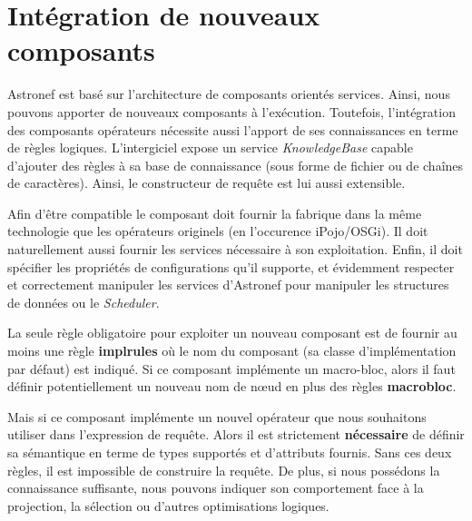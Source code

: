 \section{Intégration de nouveaux composants}\label{sec:contrib:astronef:integration}
Astronef est basé sur l'architecture de composants orientés services. Ainsi, nous pouvons apporter de nouveaux composants à l'exécution. Toutefois, l'intégration des composants opérateurs nécessite aussi l'apport de ses connaissances en terme de règles logiques. L'intergiciel expose un service \textit{KnowledgeBase} capable d'ajouter des règles à sa base de connaissance (sous forme de fichier ou de chaînes de caractères). Ainsi, le constructeur de requête est lui aussi extensible.

Afin d'être compatible le composant doit fournir la fabrique dans la même technologie que les opérateurs originels (en l'occurence iPojo/OSGi). Il doit naturellement aussi fournir les services nécessaire à son exploitation. Enfin, il doit spécifier les propriétés de configurations qu'il supporte, et évidemment respecter et correctement manipuler les services d'Astronef pour manipuler les structures de données ou le \textit{Scheduler}.

La seule règle obligatoire pour exploiter un nouveau composant est de fournir au moins une règle \textbf{implrules} où le nom du composant (sa classe d'implémentation par défaut) est indiqué. Si ce composant implémente un macro-bloc, alors il faut définir potentiellement un nouveau nom de nœud en plus des règles \textbf{macrobloc}.

Mais si ce composant implémente un nouvel opérateur que nous souhaitons utiliser dans l'expression de requête. Alors il est strictement \textbf{nécessaire} de définir sa sémantique en terme de types supportés et d'attributs fournis. Sans ces deux règles, il est impossible de construire la requête. De plus, si nous possédons la connaissance suffisante, nous pouvons indiquer son comportement face à la projection, la sélection ou d'autres optimisations logiques.
